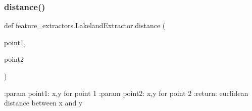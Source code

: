 \subsubsection{\texorpdfstring{distance()}{distance()}}
{\footnotesize\ttfamily def feature\+\_\+extractors.\+Lakeland\+Extractor.\+distance (\begin{DoxyParamCaption}\item[{}]{point1,  }\item[{}]{point2 }\end{DoxyParamCaption})}

\begin{DoxyVerb}:param point1: x,y for point 1
:param point2: x,y for point 2
:return: euclidean distance between x and y
\end{DoxyVerb}
 